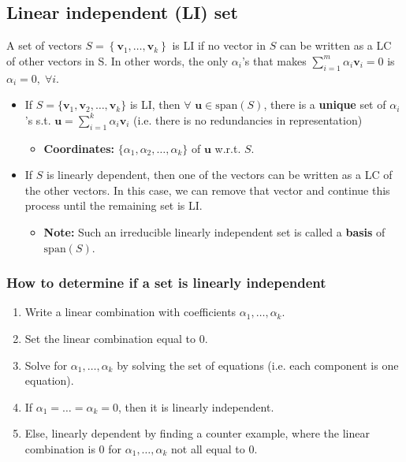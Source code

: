 \subsection{Linear independent (LI) set}
\begin{definition}
    A set of vectors \( S = \left\{\mathbf{v}_1, \ldots, \mathbf{v}_k\right\} \) is LI if no vector in $S$ can be written as a LC of other vectors in S. In other words, the only $\alpha_i$'s that makes $\sum_{i=1}^{m} \alpha_i \mathbf{v}_i = 0$ is $\alpha_i = 0, \; \forall i$.
    \begin{itemize}
        \item If \( S = \{ \mathbf{v}_1, \mathbf{v}_2, \ldots, \mathbf{v}_k \} \) is LI, then $\forall$ \( \mathbf{u} \in \text{span}(S) \), there is a \textbf{unique} set of $\alpha_i$'s s.t. $\mathbf{u} = \sum_{i=1}^k \alpha_i \mathbf{v}_i$ (i.e. there is no redundancies in representation)
        \begin{itemize}
            \item \textbf{Coordinates:} \( \{ \alpha_1, \alpha_2, \ldots, \alpha_k \} \) of \( \mathbf{u} \) w.r.t. \( S \).
        \end{itemize}
        \item If $S$ is linearly dependent, then one of the vectors can be written as a LC of the other vectors. In this case, we can remove that vector and continue this process until the remaining set is LI.
        \begin{itemize}
            \item \textbf{Note:} Such an irreducible linearly independent set is called a \textbf{basis} of \( \text{span}(S) \).
        \end{itemize}
    \end{itemize}
\end{definition}

    \subsubsection{How to determine if a set is linearly independent}
    \begin{process}
        \begin{enumerate}
            \item Write a linear combination with coefficients $\alpha_1,\ldots, \alpha_k$. 
            \item Set the linear combination equal to $0$. 
            \item Solve for $\alpha_1,\ldots, \alpha_k$ by solving the set of equations (i.e. each component is one equation).
            \item If $\alpha_1 =\ldots=\alpha_k=0$, then it is linearly independent. 
            \item Else, linearly dependent by finding a counter example, where the linear combination is $0$ for $\alpha_1,\ldots,\alpha_k$ not all equal to $0$.
        \end{enumerate}
    \end{process}

